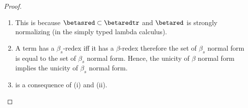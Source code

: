 \documentclass{article}
\begin{document}
\begin{proof}
\begin{enumerate}


\item This is because $\betasred \subset \betaredtr$ and $\betared$ is strongly normalizing (in the simply typed lambda calculus).

\item
A term has a $\beta_s$-redex iff it has a $\beta$-redex therefore
the set of $\beta_s$ normal form is equal to the set of $\beta_s$
normal form. Hence, the unicity of $\beta$ normal form implies the
unicity of $\beta_s$ normal form.

\item is a consequence of (i) and (ii).
\end{enumerate}
\end{proof}


\end{document}
